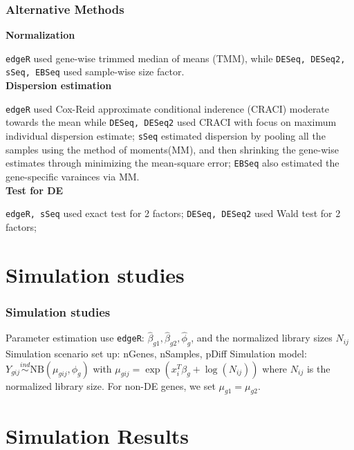 \documentclass[handout,10pt]{beamer}
\newcommand{\ind}{\stackrel{ind}{\sim}}
\begin{document}
\begin{frame}
\frametitle{Alternative Methods}

\textbf{Normalization}

{\tt edgeR} used gene-wise trimmed median of means (TMM), while {\tt DESeq, DESeq2, sSeq, EBSeq} used sample-wise size factor. \\

\textbf{Dispersion estimation}

{\tt edgeR} used Cox-Reid approximate conditional inderence (CRACI) moderate towards the mean while {\tt DESeq, DESeq2} used CRACI with focus on maximum individual dispersion estimate; {\tt sSeq} estimated dispersion by pooling all the samples using the method of moments(MM), and then shrinking the gene-wise estimates through minimizing the mean-square error; {\tt EBSeq} also estimated the gene-specific varainces via MM. \\


\textbf{Test for DE}

{\tt edgeR, sSeq} used exact test for 2 factors; {\tt DESeq, DESeq2} used Wald test for 2 factors; 

\end{frame}

\section{Simulation studies}


\begin{frame}
\frametitle{Simulation studies}

Parameter estimation use {\tt edgeR}: $\hat{\beta}_{g1}, \hat{\beta}_{g2}, \hat{\phi}_g$, and the normalized library sizes $N_{ij}$
\newline
\newline
Simulation scenario set up: nGenes, nSamples, pDiff
\newline
\newline
Simulation model: $Y_{gij} \ind \text{NB} \left (\mu_{gij}, \phi_g \right )$ with $\mu_{gij} = \exp(x_i^T\beta_g + \log(N_{ij}))$ where $N_{ij}$ is the normalized library size. For non-DE genes, we set $\mu_{g1} = \mu_{g2}$. 

\end{frame}


\section{Simulation Results}
\end{document}
